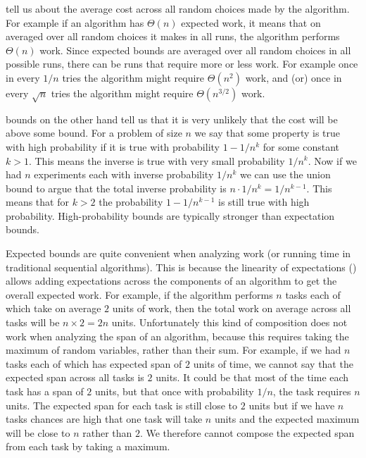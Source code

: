 { tell us about the average cost across all
random choices made by the algorithm.  
%
For example if an algorithm has $\Theta(n)$ expected work, it means that on
averaged over all random choices it makes in all runs, the algorithm
performs $\Theta(n)$ work.
%
Since expected bounds are averaged over all random choices in all
possible runs, there can be runs that require more or less work.
%
For example
%
once in every $1/n$ tries the algorithm
might require $\Theta(n^2)$ work, 
%
and (or)
%
once  in every $\sqrt{n}$ tries the algorithm might require
$\Theta(n^{3/2})$ work.


 bounds on the other hand tell us that it is
very unlikely that the cost will be above some bound.  
%
For a problem of size $n$ we say that some property is true with high
probability if it is true with probability $1 - 1/n^k$ for some
constant $k > 1$.  
%
This means the inverse is true with very small
probability $1/n^k$.
%
Now if we had $n$ experiments each with inverse probability $1/n^k$ we
can use the union bound to argue that the total inverse probability is
$n \cdot 1/n^{k} = 1/n^{k-1}$.  This means that for $k > 2$ the
probability $1 - 1/n^{k-1}$ is still true with high probability.
%
High-probability bounds are typically stronger than expectation
bounds.


Expected bounds are quite convenient when analyzing work (or
running time in traditional sequential algorithms).  
%
This is because the linearity of expectations ()
allows adding expectations across the components of an algorithm to
get the overall expected work.
%
For example, if the algorithm performs $n$ tasks each of which take on
average $2$ units of work, then the total work on average across all tasks will
be $n \times 2 = 2n$ units.
%
Unfortunately this kind of composition does not work when analyzing
the span of an algorithm, because this requires taking the maximum of
random variables, rather than their sum.
%
For example, if we had $n$ tasks each of which has expected span of
$2$ units of time, we cannot say that the expected span across all
tasks is $2$ units.
%
It could be that most of the time each task has a span of $2$ units,
but that once with probability $1/n$,  the task requires $n$ units.
%
The expected span for each task is still close to $2$ units but if we
have $n$ tasks chances are high that one task will take $n$ units and
the expected maximum will be close to $n$ rather than $2$.
%
We therefore cannot compose the expected span from each task by taking
a maximum.
%


}
